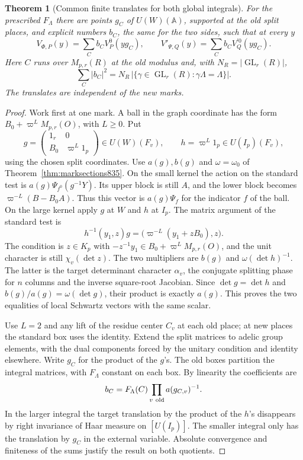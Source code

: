 \documentclass[a4paper,11pt]{article}
\newtheorem{theorem}[proposition]{Theorem}
\theoremstyle{definition}
\theoremstyle{remark}
\numberwithin{equation}{section}
\begin{document}
\begin{theorem}[Common finite translates for both global integrals]
\leavevmode\label{thm:thirdstandard837}
For the prescribed \(F_\Lambda\) there are points \(g_C\)
of \(U(W)(\mathbb A)\), supported at the old split places,
and explicit numbers \(b_C\), the same for the two sides,
such that at every \(y\)
\[
       V_{\Phi,P}(y)=\sum_C b_C V^0_P(yg_C),\qquad
       V'_{\Psi,Q}(y)=\sum_C b_C V^{\prime0}_Q(yg_C).
\]
Here \(C\) runs over \(M_{p,r}(R)\) at the old modulus
and, with \(N_R=|\operatorname{GL}_r(R)|\),
\[
       \sum_C |b_C|^2=
            N_R\,|\{\gamma\in\operatorname{GL}_r(R):
                                   \gamma\Lambda=\Lambda\}|.
\]
The translates are independent of the new marks.
\end{theorem}
\begin{proof}
Work first at one mark. A ball in the graph coordinate
has the form \(B_0+\varpi^L M_{p,r}(O)\), with \(L\ge0\).
Put
\[
 g=\begin{pmatrix}1_r&0\\ B_0&\varpi^L1_p\end{pmatrix}
       \in U(W)(F_v),\qquad h=\varpi^L1_p\in U(I_p)(F_v),
\]
using the chosen split coordinates. Use \(a(g),b(g)\) and
\(\omega=\omega_0\) of Theorem~\ref{thm:marksections835}.
On the small kernel the action on the standard test is
\(a(g)\Psi_{f^0}(g^{-1}Y)\). Its upper block is still \(A\),
and the lower block becomes \(\varpi^{-L}(B-B_0A)\).
Thus this vector is \(a(g)\Psi_f\) for the indicator \(f\)
of the ball. On the large kernel apply \(g\) at \(W\) and
\(h\) at \(I_p\). The matrix argument of the standard test
is
\[
 h^{-1}(y_1,z)g=\bigl(\varpi^{-L}(y_1+zB_0),z\bigr).
\]
The condition is \(z\in K_p\) with
\(-z^{-1}y_1\in B_0+\varpi^L M_{p,r}(O)\), and the unit
character is still \(\chi_v(\det z)\).
The two multipliers are \(b(g)\) and
\(\omega(\det h)^{-1}\). The latter is the target
determinant character \(\alpha_v\), the conjugate splitting
phase for \(n\) columns and the inverse square-root
Jacobian. Since \(\det g=\det h\) and \(b(g)/a(g)=\omega(\det g)\),
their product is exactly \(a(g)\). This proves the two
equalities of local Schwartz vectors with the same scalar.

Use \(L=2\) and any lift of the residue center \(C_v\) at
each old place; at new places the standard box uses the
identity. Extend the split matrices to adelic group
elements, with the dual components forced by the unitary
condition and identity elsewhere. Write \(g_C\) for the
product of the \(g\)'s. The old boxes partition the integral
matrices, with \(F_\Lambda\) constant on each box. By
linearity the coefficients are
\[
          b_C=F_\Lambda(C)\prod_{v\ {\rm old}} a(g_{C,v})^{-1}.
\]
In the larger integral the target translation by the product
of the \(h\)'s disappears by right invariance of Haar measure
on \([U(I_p)]\). The smaller integral only has the translation
by \(g_C\) in the external variable. Absolute convergence and
finiteness of the sums justify the result on both quotients.


\end{proof}
\end{document}

